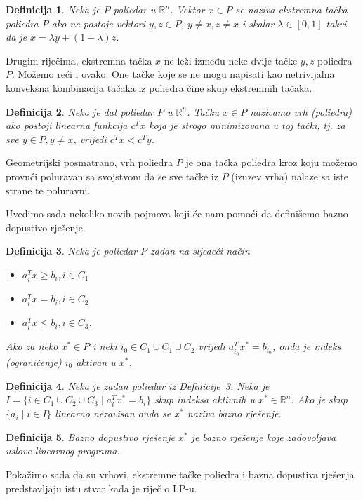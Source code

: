 \documentclass[a4paper, utf8, 11pt, colorlinks]{book}
\newtheorem{definition}{Definicija}
\begin{document}
\begin{definition}
   Neka je $P$ poliedar u $\mathbb{R}^n$.  Vektor $x \in P$ se naziva ekstremna tačka poliedra $P$
   ako ne postoje vektori $y, z \in P$, $y \neq x, z \neq x$ i skalar $\lambda \in [0, 1]$ takvi da je  $x = \lambda y + (1-\lambda)z$.
\end{definition}

 Drugim riječima, ekstremna tačka $x$ ne leži između neke dvije tačke $y,z$    poliedra $P$.
Možemo reći i ovako: One tačke koje se ne mogu napisati kao netrivijalna konveksna kombinacija tačaka iz poliedra čine skup ekstremnih tačaka. 
 
 
\begin{definition}
   Neka je dat poliedar $P$ u $\mathbb{R}^n$. Tačku $x \in P$ nazivamo vrh (poliedra) ako postoji linearna funkcija  $c^T x$ koja je strogo minimizovana u toj tački, tj. za sve  $y\in P, y \neq x$, vrijedi $c^T x < c^T y$. 
\end{definition}
Geometrijski posmatrano,  vrh poliedra $P$ je ona tačka poliedra  kroz koju možemo provući poluravan sa svojstvom da se sve tačke iz $P$ (izuzev vrha) nalaze sa iste strane te poluravni.

Uvedimo sada nekoliko novih pojmova koji će nam pomoći da definišemo bazno dopustivo rješenje.

\begin{definition}\label{dfn:lp_aktivan}
   Neka je poliedar $P$ zadan na sljedeći način
   \begin{itemize}
       \item $a_i^T x \geq b_i, i \in C_1$
       \item $a_i^T x = b_i, i \in C_2 $
       \item $a_i^T x \leq b_i, i \in C_3 $. 
   \end{itemize}
   Ako za neko $x^* \in P$ i neki $i_0 \in C_1 \cup C_1 \cup C_2$ vrijedi 
   $a_{i_0}^T x^* = b_{i_0}$, onda je indeks (ograničenje) $i_0$ aktivan u $x^*$. 
\end{definition}

\begin{definition}
      Neka je zadan poliedar iz Definicije~\ref{dfn:lp_aktivan}. Neka je 
      $I = \{ i \in C_1 \cup C_2 \cup C_3 \mid a_i^T x^* = b_i \}$  skup indeksa aktivnih u $x^*\in \mathbb{R}^n$.  Ako je skup $\{ a_i \mid i \in I \}$ linearno nezavisan onda se $x^*$  naziva bazno rješenje. 
\end{definition}
\begin{definition}
	 Bazno dopustivo rješenje $x^*$ je bazno rješenje koje zadovoljava  uslove linearnog programa. 
\end{definition}
Pokažimo sada da su vrhovi, ekstremne tačke poliedra i bazna dopustiva rješenja predstavljaju istu stvar kada je riječ o LP-u.
\end{document}
